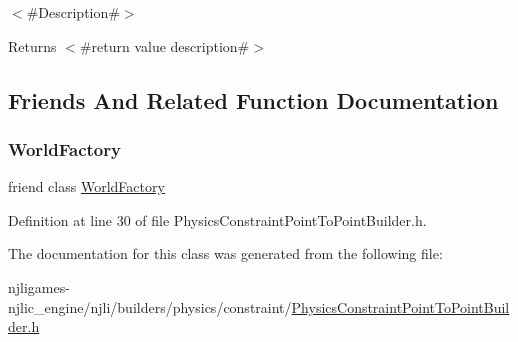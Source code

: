 $<$\#\+Description\#$>$

\begin{DoxyReturn}{Returns}
$<$\#return value description\#$>$ 
\end{DoxyReturn}


\subsection{Friends And Related Function Documentation}
\mbox{\label{classnjli_1_1_physics_constraint_point_to_point_builder_acb96ebb09abe8f2a37a915a842babfac}} 
\subsubsection{\texorpdfstring{World\+Factory}{WorldFactory}}
{\footnotesize\ttfamily friend class \mbox{\hyperlink{classnjli_1_1_world_factory}{World\+Factory}}\hspace{0.3cm}{\ttfamily [friend]}}



Definition at line 30 of file Physics\+Constraint\+Point\+To\+Point\+Builder.\+h.



The documentation for this class was generated from the following file\+:\begin{DoxyCompactItemize}
\item 
njligames-\/njlic\+\_\+engine/njli/builders/physics/constraint/\mbox{\hyperlink{_physics_constraint_point_to_point_builder_8h}{Physics\+Constraint\+Point\+To\+Point\+Builder.\+h}}\end{DoxyCompactItemize}
